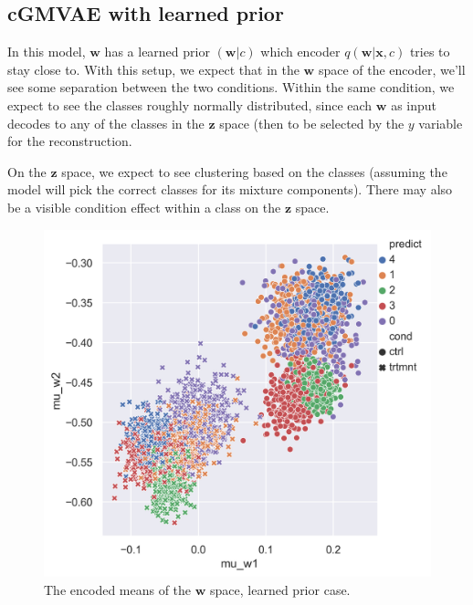 \documentclass[11pt, a4paper]{report}
\theoremstyle{plain}
\theoremstyle{definition}
\theoremstyle{remark}
\newcommand{\x}{\mathbf{x}}
\newcommand{\z}{\mathbf{z}}
\newcommand{\w}{\mathbf{w}}
\begin{document}
\subsection{cGMVAE with learned prior}

In this model, $\w$ has a learned prior $(\w | c)$ which encoder $q(\w | \x, c)$ 
tries to stay close to.
With this setup, we expect that in the $\w$ space of the 
encoder, we'll see some separation between the two conditions.
Within the same condition, we expect to see the classes roughly normally
distributed, since each $\w$ as input decodes to any of the classes in the $\z$
space (then to be selected by the $y$ variable for the reconstruction.

On the $\z$ space, we expect to see clustering based on the classes (assuming
the model will pick the correct classes for its mixture components).
There may also be a visible condition effect within a class on the $\z$ space.

\begin{figure}[h]
\centering
\includegraphics[width=1.1\textwidth]{images/blobs_cgmvae_learnedprior_mu_w.png}
\caption{The encoded means of the $\w$ space, learned prior case.
}
\label{fig:blobs_lp_muw}
\end{figure}
\end{document}
